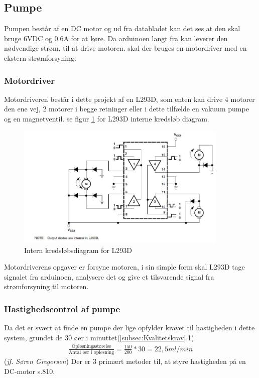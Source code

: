  \subsection{Pumpe}
 Pumpen består af en DC motor og ud fra databladet kan det ses at den skal bruge 6VDC og 0.6A for at køre. Da arduinoen langt fra kan leverer den nødvendige strøm, til at drive motoren. skal der bruges en motordriver med en ekstern strømforsyning.
 \subsubsection{Motordriver}
 Motordriveren består i dette projekt af en L293D, som enten kan drive 4 motorer den ene vej, 2 motorer i begge retninger eller i dette tilfælde en vakuum pumpe og en magnetventil. se figur \ref{fig:L293DInterndiagram} for L293D interne kredsløb diagram. 
   \begin{figure}[H]
	\centering
	\includegraphics[width=0.9\textwidth]{billeder/Hardware/diagrammer/L293intern.JPG}
	\caption{Intern kredsløbsdiagram for L293D}
	\label{fig:L293DInterndiagram}
\end{figure}
Motordriverens opgaver er forsyne motoren, i sin simple form skal L293D tage signalet fra arduinoen, analysere det og give et tilsvarende signal fra strømforsyning til motoren.
\subsubsection{Hastighedscontrol af pumpe}
Da det er svært at finde en pumpe der lige opfylder kravet til hastigheden i dette system, grundet de 30 øer i minuttet(\ref{subsec:Kvalitetskrav}.1)
\begin{align}
\frac{\text{Opløsningsstørelse}}{\text{Antal øer i opløsning}} = \frac{150}{200}*30 = 22,5ml/min
\label{eg:ohastighed}
\end{align}(\textit{jf. Søren Gregersen})
Der er 3 primært metoder til, at styre hastigheden på en DC-motor \citep{ELengbog}s.810.

